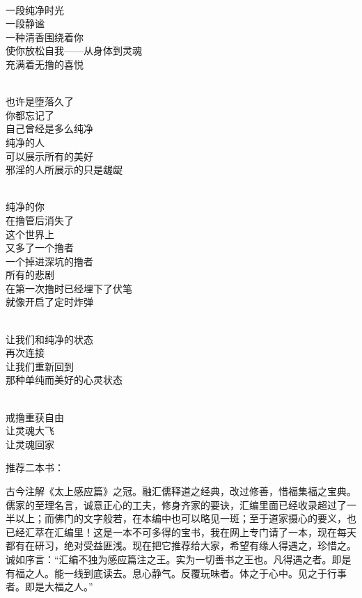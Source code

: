 \begin{poem}[让灵魂回家]
    \begin{multicols}{2}
        \begin{center}~\\
            一段纯净时光 \\ 一段静谧 \\ 一种清香围绕着你 \\ 使你放松自我——从身体到灵魂 \\ 充满着无撸的喜悦

            ~\\

            也许是堕落久了 \\ 你都忘记了 \\ 自己曾经是多么纯净 \\ 纯净的人 \\ 可以展示所有的美好 \\ 邪淫的人所展示的只是龌龊

            ~\\

            纯净的你 \\ 在撸管后消失了 \\ 这个世界上 \\ 又多了一个撸者 \\ 一个掉进深坑的撸者 \\ 所有的悲剧 \\ 在第一次撸时已经埋下了伏笔 \\ 就像开启了定时炸弹

            ~\\

            让我们和纯净的状态 \\ 再次连接 \\ 让我们重新回到 \\ 那种单纯而美好的心灵状态

            ~\\

            戒撸重获自由 \\ 让灵魂大飞 \\ 让灵魂回家
        \end{center}
    \end{multicols}
\end{poem}

推荐二本书：

\begin{book}[《感应篇汇编》]
    古今注解《太上感应篇》之冠。融汇儒释道之经典，改过修善，惜福集福之宝典。儒家的至理名言，诚意正心的工夫，修身齐家的要诀，汇编里面已经收录超过了一半以上；而佛门的文字般若，在本编中也可以略见一斑；至于道家摄心的要义，也已经汇萃在汇编里！这是一本不可多得的宝书，我在网上专门请了一本，现在每天都有在研习，绝对受益匪浅。现在把它推荐给大家，希望有缘人得遇之，珍惜之。诚如序言：“汇编不独为感应篇注之王。实为一切善书之王也。凡得遇之者。即是有福之人。能一线到底读去。息心静气。反覆玩味者。体之于心中。见之于行事者。即是大福之人。”
\end{book}

